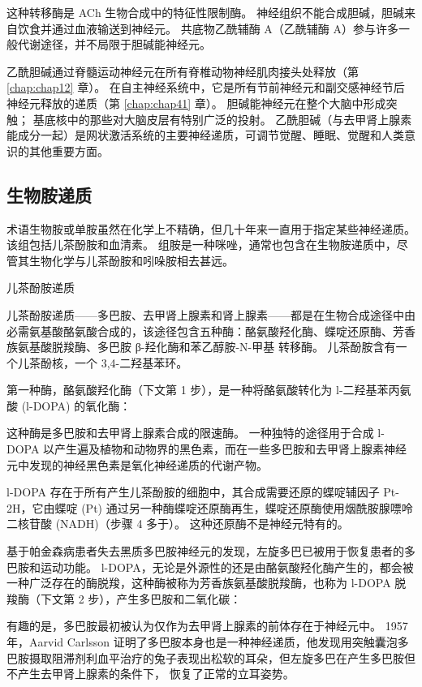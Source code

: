 这种转移酶是 ACh 生物合成中的特征性限制酶。 
神经组织不能合成胆碱，胆碱来自饮食并通过血液输送到神经元。 
共底物乙酰辅酶 A（乙酰辅酶 A）参与许多一般代谢途径，并不局限于胆碱能神经元。


乙酰胆碱通过脊髓运动神经元在所有脊椎动物神经肌肉接头处释放（第 \ref{chap:chap12} 章）。 
在自主神经系统中，它是所有节前神经元和副交感神经节后神经元释放的递质（第 \ref{chap:chap41} 章）。 
胆碱能神经元在整个大脑中形成突触； 基底核中的那些对大脑皮层有特别广泛的投射。 
乙酰胆碱（与去甲肾上腺素能成分一起）是网状激活系统的主要神经递质，可调节觉醒、睡眠、觉醒和人类意识的其他重要方面。




\subsection{生物胺递质}

术语生物胺或单胺虽然在化学上不精确，但几十年来一直用于指定某些神经递质。 
该组包括儿茶酚胺和血清素。 
组胺是一种咪唑，通常也包含在生物胺递质中，尽管其生物化学与儿茶酚胺和吲哚胺相去甚远。


儿茶酚胺递质

儿茶酚胺递质——多巴胺、去甲肾上腺素和肾上腺素——都是在生物合成途径中由必需氨基酸酪氨酸合成的，该途径包含五种酶：酪氨酸羟化酶、蝶啶还原酶、芳香族氨基酸脱羧酶、多巴胺 β-羟化酶和苯乙醇胺-N-甲基 转移酶。 儿茶酚胺含有一个儿茶酚核，一个 3,4-二羟基苯环。


第一种酶，酪氨酸羟化酶（下文第 1 步），是一种将酪氨酸转化为 l-二羟基苯丙氨酸 (l-DOPA) 的氧化酶：


这种酶是多巴胺和去甲肾上腺素合成的限速酶。 
一种独特的途径用于合成 l-DOPA 以产生遍及植物和动物界的黑色素，而在一些多巴胺和去甲肾上腺素神经元中发现的神经黑色素是氧化神经递质的代谢产物。


l-DOPA 存在于所有产生儿茶酚胺的细胞中，其合成需要还原的蝶啶辅因子 Pt-2H，它由蝶啶 (Pt) 通过另一种酶蝶啶还原酶再生，蝶啶还原酶使用烟酰胺腺嘌呤二核苷酸 (NADH)（步骤 4 多于）。 
这种还原酶不是神经元特有的。


基于帕金森病患者失去黑质多巴胺神经元的发现，左旋多巴已被用于恢复患者的多巴胺和运动功能。 
l-DOPA，无论是外源性的还是由酪氨酸羟化酶产生的，都会被一种广泛存在的酶脱羧，这种酶被称为芳香族氨基酸脱羧酶，也称为 l-DOPA 脱羧酶（下文第 2 步），产生多巴胺和二氧化碳：


有趣的是，多巴胺最初被认为仅作为去甲肾上腺素的前体存在于神经元中。 
1957 年，Aarvid Carlsson 证明了多巴胺本身也是一种神经递质，他发现用突触囊泡多巴胺摄取阻滞剂利血平治疗的兔子表现出松软的耳朵，但左旋多巴在产生多巴胺但不产生去甲肾上腺素的条件下， 恢复了正常的立耳姿势。


